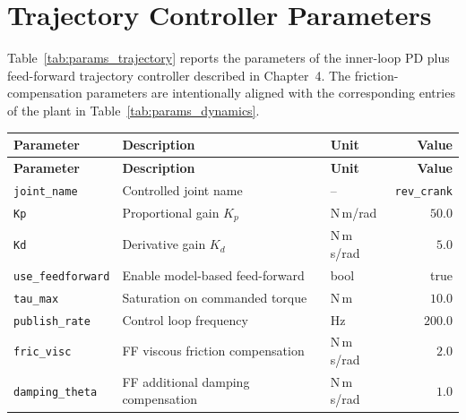 \newpage
\section{Trajectory Controller Parameters}
\label{app:params:trajectory}

Table~\ref{tab:params_trajectory} reports the parameters of the inner-loop PD plus feed-forward trajectory controller described in Chapter~4. The friction-compensation parameters are intentionally aligned with the corresponding entries of the plant in Table~\ref{tab:params_dynamics}.

\small
\begin{tabularx}{\textwidth}{@{}l L l r@{}}
\caption{Trajectory controller parameters
(\texttt{trajectory\_controller} node).}
\label{tab:params_trajectory}\\
\hline
\textbf{Parameter} & \textbf{Description} & \textbf{Unit} & \textbf{Value} \\
\hline
\endfirsthead
\hline
\textbf{Parameter} & \textbf{Description} & \textbf{Unit} & \textbf{Value} \\
\hline
\endhead
\texttt{joint\_name}     & Controlled joint name                & --           & \texttt{rev\_crank} \\
\texttt{Kp}              & Proportional gain $K_p$              & N\,m/rad     & $50.0$  \\
\texttt{Kd}              & Derivative gain $K_d$                & N\,m\,s/rad  & $5.0$   \\
\texttt{use\_feedforward}& Enable model-based feed-forward      & bool         & true    \\
\texttt{tau\_max}        & Saturation on commanded torque       & N\,m         & $10.0$  \\
\texttt{publish\_rate}   & Control loop frequency               & Hz           & $200.0$ \\
\texttt{fric\_visc}      & FF viscous friction compensation     & N\,m\,s/rad  & $2.0$   \\
\texttt{damping\_theta}  & FF additional damping compensation   & N\,m\,s/rad  & $1.0$   \\
\hline
\end{tabularx}
\normalsize

